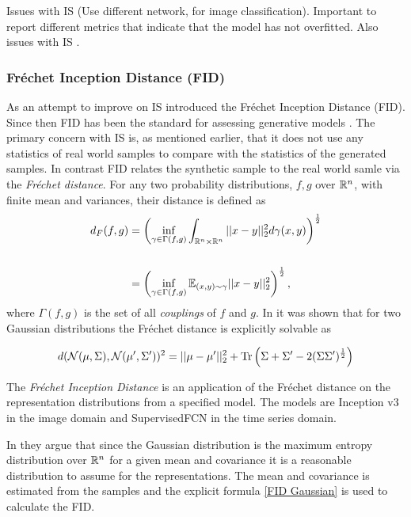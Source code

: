 \documentclass[../../thesis.tex]{subfiles}
\begin{document}
Issues with IS \cite{barratt2018note} (Use different network, for image classification).  Important to report different metrics that indicate that the model has not overfitted. 
Also issues with IS \cite{borji2021pros}.\newline

\subsubsection{Fréchet Inception Distance (FID)}
As an attempt to improve on IS \cite{heusel2018gans} introduced the Fréchet Inception Distance (FID). Since then FID has been the standard for assessing generative models \cite{borji2021pros}.\newline
The primary concern with IS is, as mentioned earlier, that it does not use any statistics of real world samples to compare with the statistics of the generated samples. In contrast FID relates the synthetic sample to the real world samle via the \textit{Fréchet distance}. For any two probability distributions, $f,g$ over $\mathbb{R}^n$, with finite mean and variances, their  distance is defined as 
\begin{equation}
    \begin{aligned}
        d_F(f,g) &= \left(\inf_{\gamma \in \Gamma(f,g)} \int_{\mathbb{R}^n\times\mathbb{R}^n}||x-y||_2^2d\gamma(x,y) \right)^{\frac{1}{2}}\\\\
            &= \left(\inf_{\gamma \in \Gamma(f,g)} \mathbb{E}_{(x,y)\sim \gamma} ||x-y||_2^2\right)^{\frac{1}{2}},
    \end{aligned}
\end{equation}
where $\Gamma(f,g)$ is the set of all \textit{couplings} of $f$ and $g$. In \cite{DOWSON1982450} it was shown that for two Gaussian distributions the Fréchet distance is explicitly solvable as

\begin{equation}
    \label{eq:FID Gaussian}
    d(\mathcal{N}(\mu,\Sigma),\mathcal{N}(\mu',\Sigma'))^2 = ||\mu-\mu'||_2^2 + \operatorname{Tr} \left( \Sigma + \Sigma' - 2(\Sigma\Sigma')^{\frac12}\right)
\end{equation}

The \textit{Fréchet Inception Distance} is an application of the Fréchet distance on the representation distributions from a specified model. The models are Inception v3 in the image domain and SupervisedFCN in the time series domain.\newline

In \cite{heusel2018gans} they argue that since the Gaussian distribution is the maximum entropy distribution over $\mathbb{R}^n$ for a given mean and covariance it is a reasonable distribution to assume for the representations. The mean and covariance is estimated from the samples and the explicit formula \ref{FID Gaussian} is used to calculate the FID. \newline
\end{document}
